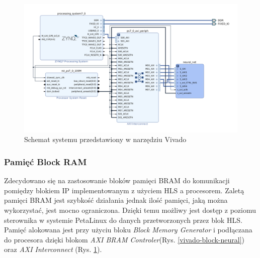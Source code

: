 \begin{figure}[h]
  \centering
  \includegraphics[width=\textwidth]{img/vivado-block-design.png}
  \caption{Schemat systemu przedstawiony w narzędziu Vivado}
  \label{vivado-block-design}
\end{figure}

\subsubsection{Pamięć Block RAM}
Zdecydowano się na zastosowanie bloków pamięci BRAM do komunikacji pomiędzy 
blokiem IP implementowanym z użyciem HLS a procesorem. Zaletą pamięci BRAM jest szybkość 
działania jednak ilość pamięci, jaką można wykorzystać, jest mocno ograniczona. 
Dzięki temu możliwy jest dostęp z poziomu sterownika w systemie PetaLinux do danych
przetworzonych przez blok HLS. Pamięć alokowana jest przy użyciu bloku 
\emph{Block Memory Generator} i podłączana do procesora dzięki blokom 
\emph{AXI BRAM Controler}(Rys. \ref{vivado-block-neural}) oraz \emph{AXI Interconnect} 
(Rys. \ref{vivado-block-design}).

